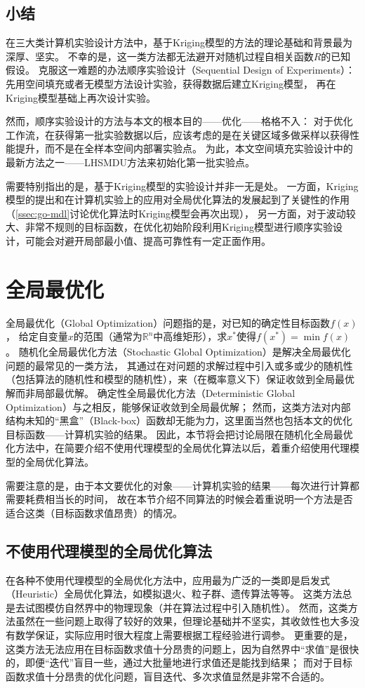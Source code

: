 \documentclass[index]{subfiles}
\begin{document}
\subsection{小结}
在三大类计算机实验设计方法中，基于Kriging模型的方法的理论基础和背景最为深厚、坚实。
不幸的是，这一类方法都无法避开对随机过程自相关函数$R$的已知假设。
克服这一难题的办法顺序实验设计（Sequential Design of Experiments）：
先用空间填充或者无模型方法设计实验，获得数据后建立Kriging模型，
再在Kriging模型基础上再次设计实验。

然而，顺序实验设计的方法与本文的根本目的——优化——格格不入：
对于优化工作流，在获得第一批实验数据以后，应该考虑的是在关键区域多做采样以获得性能提升，而不是在全样本空间内部署实验点。
为此，本文空间填充实验设计中的最新方法之一——LHSMDU方法来初始化第一批实验点。

需要特别指出的是，基于Kriging模型的实验设计并非一无是处。
一方面，Kriging模型的提出和在计算机实验上的应用对全局优化算法的发展起到了关键性的作用（\cref{ssec:go-mdl}讨论优化算法时Kriging模型会再次出现），
另一方面，对于波动较大、非常不规则的目标函数，在优化初始阶段利用Kriging模型进行顺序实验设计，可能会对避开局部最小值、提高可靠性有一定正面作用。

\section{全局最优化}
全局最优化（Global Optimization）问题指的是，对已知的确定性目标函数$f(x)$，
给定自变量$x$的范围（通常为$\mathbb{R}^n$中高维矩形），求$x^\ast$使得$f(x^\ast)=\min f(x)$。
随机化全局最优化方法（Stochastic Global Optimization）是解决全局最优化问题的最常见的一类方法，
其通过在对问题的求解过程中引入或多或少的随机性（包括算法的随机性和模型的随机性），来（在概率意义下）保证收敛到全局最优解而非局部最优解。\cite{zhigljavsky2007}
确定性全局最优化方法（Deterministic Global Optimization）与之相反，能够保证收敛到全局最优解；
然而，这类方法对内部结构未知的“黑盒”（Black-box）函数却无能为力，这里面当然也包括本文的优化目标函数——计算机实验的结果。
因此，本节将会把讨论局限在随机化全局最优化方法中，在简要介绍不使用代理模型的全局优化算法以后，着重介绍使用代理模型的全局优化算法。

需要注意的是，由于本文要优化的对象——计算机实验的结果——每次进行计算都需要耗费相当长的时间，
故在本节介绍不同算法的时候会着重说明一个方法是否适合这类（目标函数求值昂贵）的情况。

\subsection{不使用代理模型的全局优化算法}
在各种不使用代理模型的全局优化方法中，应用最为广泛的一类即是启发式（Heuristic）全局优化算法，如模拟退火、粒子群、遗传算法等等。
这类方法总是去试图模仿自然界中的物理现象（并在算法过程中引入随机性）。
然而，这类方法虽然在一些问题上取得了较好的效果，但理论基础并不坚实，其收敛性也大多没有数学保证，实际应用时很大程度上需要根据工程经验进行调参\cite{zhigljavsky2007}。
更重要的是，这类方法无法应用在目标函数求值十分昂贵的问题上，因为自然界中“求值”是很快的，即便“迭代”盲目一些，通过大批量地进行求值还是能找到结果；
而对于目标函数求值十分昂贵的优化问题，盲目迭代、多次求值显然是非常不合适的。
\end{document}
